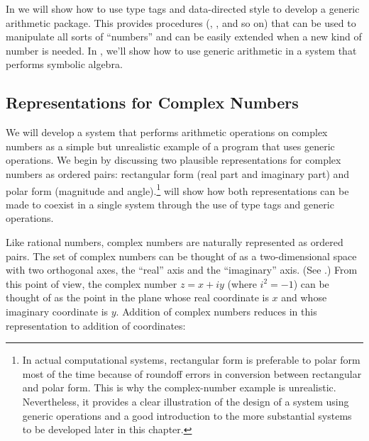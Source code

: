 In  we will show how to use type tags and data-directed style
to develop a generic arithmetic package.  This provides procedures (,
, and so on) that can be used to manipulate all sorts of ``numbers''
and can be easily extended when a new kind of number is needed.  In
, we'll show how to use generic arithmetic in a system that performs
symbolic algebra.



\subsection{Representations for Complex Numbers}
\label{Section 2.4.1}

We will develop a system that performs arithmetic operations on complex numbers
as a simple but unrealistic example of a program that uses generic operations.
We begin by discussing two plausible representations for complex numbers as
ordered pairs: rectangular form (real part and imaginary part) and polar form
(magnitude and angle).\footnote{In actual computational systems, rectangular
form is preferable to polar form most of the time because of roundoff errors in
conversion between rectangular and polar form.  This is why the complex-number
example is unrealistic.  Nevertheless, it provides a clear illustration of the
design of a system using generic operations and a good introduction to the more
substantial systems to be developed later in this chapter.}
 will show how both representations can be made to coexist in a
single system through the use of type tags and generic operations.

Like rational numbers, complex numbers are naturally represented as ordered
pairs.  The set of complex numbers can be thought of as a two-dimensional space
with two orthogonal axes, the ``real'' axis and the ``imaginary'' axis. (See
.)  From this point of view, the complex number
\( z = x + iy \) (where \( i^2 = -1 \)) can be thought of as the point in the plane
whose real coordinate is \( x \) and whose imaginary coordinate is \( y \).
Addition of complex numbers reduces in this representation to addition of
coordinates:
\begin{comment}

\begin{example}
Real-part(z_1 + z_2) = Real-part(z_1) + Real-part(z_2)

Imaginary-part(z_1 + z_2) = Imaginary-part(z_1) + Imaginary-part(z_2)
\end{example}

\end{comment}

